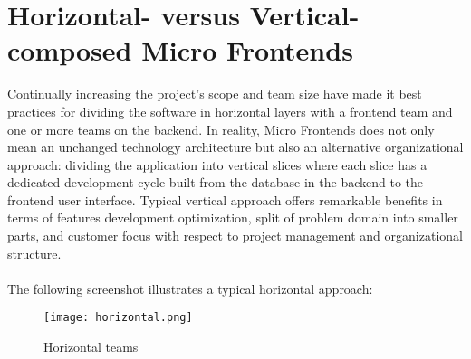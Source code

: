 \documentclass[a4paper]{book}
\begin{document}
\section{Horizontal- versus Vertical-composed Micro Frontends}
Continually increasing the project's scope and team size have made it best practices for dividing the software in horizontal layers with a frontend team and one or more teams on the backend. In reality, Micro Frontends does not only mean an unchanged technology architecture but also an alternative organizational approach: dividing the application into vertical slices where each slice has a dedicated development cycle built from the database in the backend to the frontend user interface. Typical vertical approach offers remarkable benefits in terms of features development optimization, split of problem domain into smaller parts, and customer focus with respect to project management and organizational structure.
\\
\\
The following screenshot illustrates a typical horizontal approach: 

\begin{figure}[h!]
    \centering
    \captionsetup{justification=centering}
    \texttt{[image: horizontal.png]}
    \caption{Horizontal teams}
    \label{fig:1}
\end{figure}
\end{document}
